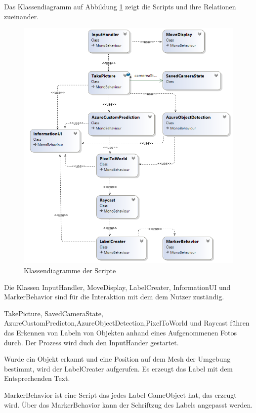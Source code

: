 Das Klassendiagramm auf Abbildung \ref{dia:classdiagramm} zeigt die Scripts und ihre Relationen zueinander.

\begin{figure}[H]
	\centering
	\includegraphics[width=1\textwidth]{images/klassendiagramm.png}
	\caption[]{Klassendiagramme der Scripte}
	\label{dia:classdiagramm}
\end{figure}
 
Die Klassen InputHandler, MoveDisplay, LabelCreater, InformationUI und MarkerBehavior sind für die Interaktion mit dem dem Nutzer zuständig. 

TakePicture, SavedCameraState, AzureCustomPredicton,AzureObjectDetection,PixelToWorld und Raycast führen das Erkennen von Labeln von Objekten anhand eines Aufgenommenen Fotos durch. Der Prozess wird duch den InputHander gestartet. 

Wurde ein Objekt erkannt und eine Position auf dem Mesh der Umgebung bestimmt, wird der LabelCreater aufgerufen. Es erzeugt das Label mit dem Entsprechenden Text.

MarkerBehavior ist eine Script das jedes Label GameObject hat, das erzeugt wird. Über das MarkerBehavior kann der Schriftzug des Labels angepasst werden.

